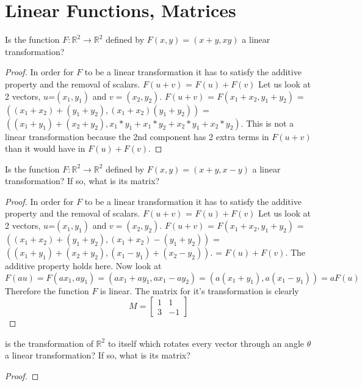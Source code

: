 \documentclass[12pt]{book}
\newcommand{\R}{\mathbb{R}}
\newenvironment{exercise}[2][Exercise]{\begin{trivlist}
\item[\hskip \labelsep {\bfseries #1}\hskip \labelsep {\bfseries #2.}]}{\end{trivlist}}
\begin{document}
\section{Linear Functions, Matrices}

\begin{exercise}{8.4.6}
Is the function $F: \R^2 \to \R^2$ defined by $F(x,y) = (x+y, xy)$ a linear transformation?
\begin{proof} 
In order for $F$ to be a linear transformation it has to satisfy the additive property and the removal of scalars. $F(u+v)$ = $F(u) + F(v)$ Let us look at 2 vectors, $u$=$(x_1,y_1)$ and $v=(x_2,y_2)$. $F(u+v)$ = $F(x_1 + x_2, y_1 + y_2)$ 
= $((x_1 + x_2) + (y_1 + y_2), (x_1 + x_2)(y_1 + y_2))$ 
= $((x_1 + y_1) + (x_2 + y_2), x_1*y_1 + x_1*y_2 + x_2*y_1 + x_2*y_2)$. 
This is not a linear transformation because the 2nd component has 2 extra terms in $F(u+v)$ than it would have in $F(u) + F(v)$. 

\end{proof}

\end{exercise}


\begin{exercise}{8.4.7}
Is the function $F: \R^2 \to \R^2$ defined by $F(x,y) = (x+y, x-y)$ a linear transformation? If so, what is its matrix?
\begin{proof}
In order for $F$ to be a linear transformation it has to satisfy the additive property and the removal of scalars.  $F(u+v)$ = $F(u) + F(v)$ Let us look at 2 vectors, $u$=$(x_1,y_1)$ and $v=(x_2,y_2)$. $F(u+v)$ = $F(x_1 + x_2, y_1 + y_2)$ = $((x_1 + x_2) + (y_1 + y_2), (x_1 + x_2) - (y_1 + y_2))$ = $((x_1 + y_1) + (x_2 + y_2), (x_1 - y_1) + (x_2 - y_2))$. = $F(u) + F(v)$. The additive property holds here. Now look at $F(au) = F(ax_1, ay_1) = (ax_1 + ay_1, ax_1 - ay_2) = (a(x_1 + y_1), a(x_1 - y_1)) = aF(u)$  Therefore the function $F$ is linear. The matrix for it's transformation is clearly \[
M=
  \begin{bmatrix}
    1 & 1 \\
    3 & -1
  \end{bmatrix}
\] 


\end{proof}
\end{exercise}
\begin{exercise}{8.4.8}
is the transformation of $\R^2$ to itself which rotates every vector through an angle $\theta$ a linear transformation? If so, what is its matrix?
\begin{proof}

\end{proof}
\end{exercise}
\end{document}
